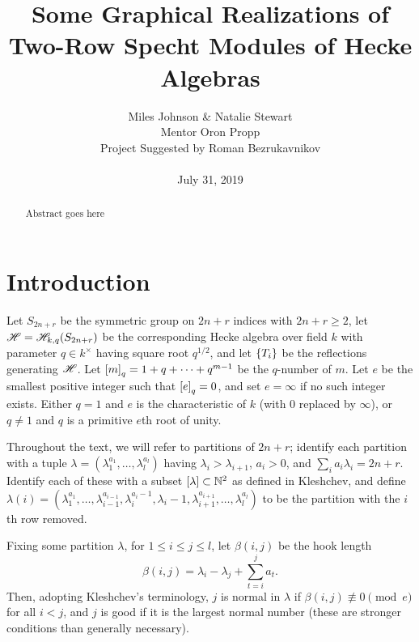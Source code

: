 \documentclass{amsart}
\begin{document}
\title[Some Graphical Realizations of Two-Row Specht Modules of Hecke Algebras]{Some Graphical Realizations of Two-Row Specht Modules  of Hecke Algebras}
\author[Miles Johnson \& Natalie Stewart]{Miles Johnson \& Natalie Stewart\\
  Mentor Oron Propp\\
Project Suggested by Roman Bezrukavnikov\\ \; \\
July 31, 2019
}

\begin{titlepage}
  \maketitle
  \begin{abstract}
  Abstract goes here
  \end{abstract}
\end{titlepage}

\section{Introduction}
Let $S_{2n+r}$ be the symmetric group on $2n+r$ indices with $2n + r \geq 2$, let $\mathscr{H} = \mathscr{H}_{k,q}(S_{2n+r})$ be the corresponding Hecke algebra over field $k$ with parameter $q \in k^\times$ having square root $q^{1/2}$, and let $\left\{ T_i \right\}$ be the reflections generating $\mathscr{H}$.
Let $\left[ m \right]_q = 1 + q + \dots + q^{m-1}$ be the $q$-number of $m$. 
Let $e$ be the smallest positive integer such that $\left[ e \right]_q = 0$, and set $e = \infty$ if no such integer exists.
Either $q = 1$ and $e$ is the characteristic of $k$ (with $0$ replaced by $\infty$), or $q \neq 1$ and $q$ is a primitive $e$th root of unity.

Throughout the text, we will refer to partitions of $2n + r$;
identify each partition with a tuple $\lambda = (\lambda_1^{a_1},\dots,\lambda_l^{a_l})$ having $\lambda_i > \lambda_{i+1}$, $a_i > 0$, and $\sum_i a_i\lambda_i = 2n + r$.
Identify each of these with a subset $\left[ \lambda \right] \subset \mathbb{N}^2$ as defined in Kleshchev, and define $\lambda(i) = (\lambda_1^{a_1},\dots,\lambda_{i-1}^{a_{i-1}},\lambda_i^{a_i - 1},\lambda_i-1,\lambda_{i+1}^{a_{i+1}},\dots,\lambda_l^{a_l})$ to be the partition with the $i$th row removed.

Fixing some partition $\lambda$, for $1 \leq i \leq j \leq l$, let $\beta(i,j)$ be the hook length
\[
  \beta(i,j) = \lambda_i - \lambda_j + \sum_{t = i}^j a_t.
\]
Then, adopting Kleshchev's terminology, $j$ is normal in $\lambda$ if $\beta(i,j) \not\equiv 0 \pmod e$ for all $i < j$, and $j$ is good if it is the largest normal number (these are stronger conditions than generally necessary). 
\end{document}
